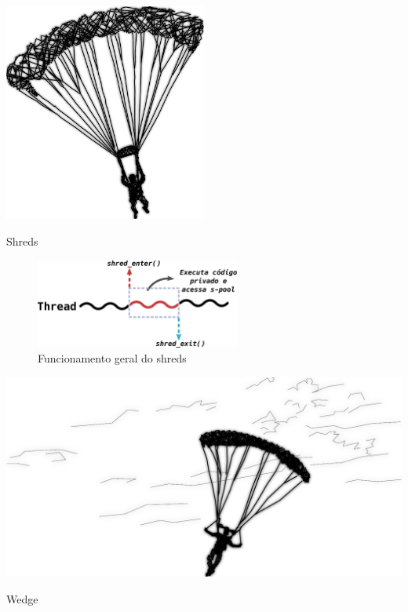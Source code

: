 \documentclass[xcolor={usenames,svgnames,dvipsnames},brazil,english,12pt,aspectratio=149]{beamer}
\begin{document}
\begin{frame}[plain]
  \includegraphics[width=0.5\textwidth]{presentation_cap2_one}
\end{frame}

\begin{frame}{Shreds}
	\begin{figure}[!h]
		\centering
		\includegraphics[width=0.6\textwidth]{shreds} 
		\caption{Funcionamento geral do shreds}
		\label{fig:shreds}
	\end{figure}
\end{frame}

\begin{frame}[plain]
  \includegraphics[width=\textwidth]{presentation_cap2_three}
\end{frame}

\begin{frame}{Wedge}
\end{frame}
\end{document}
